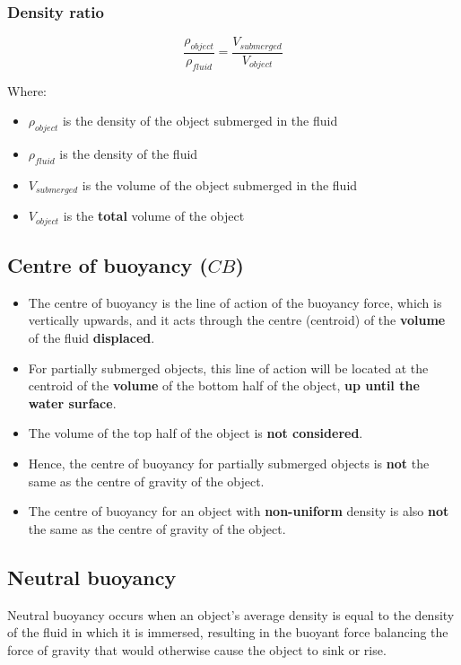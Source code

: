 \documentclass[11pt]{article}
\begin{document}
\subsubsection{Density ratio}
\label{sec:org7523787}
\[\frac{\rho_{object}}{\rho_{fluid}} = \frac{V_{submerged}}{V_{object}}\]

Where:
\begin{itemize}
\item \(\rho_{object}\) is the density of the object submerged in the fluid
\item \(\rho_{fluid}\) is the density of the fluid
\item \(V_{submerged}\) is the volume of the object submerged in the fluid
\item \(V_{object}\) is the \textbf{total} volume of the object
\end{itemize}

\newpage
\subsection{Centre of buoyancy (\(CB\))}
\label{sec:orge8b3de8}
\begin{itemize}
\item The centre of buoyancy is the line of action of the buoyancy force, which is vertically upwards, and it acts through the centre (centroid) of the \textbf{volume} of the fluid \textbf{displaced}.
\item For partially submerged objects, this line of action will be located at the centroid of the \textbf{volume} of the bottom half of the object, \textbf{up until the water surface}.
\item The volume of the top half of the object is \textbf{not considered}.
\item Hence, the centre of buoyancy for partially submerged objects is \textbf{not} the same as the centre of gravity of the object.
\item The centre of buoyancy for an object with \textbf{non-uniform} density is also \textbf{not} the same as the centre of gravity of the object.
\end{itemize}
\subsection{Neutral buoyancy}
\label{sec:org0581feb}
Neutral buoyancy occurs when an object's average density is equal to the density of the fluid in which it is immersed, resulting in the buoyant force balancing the force of gravity that would otherwise cause the object to sink or rise.
\end{document}
